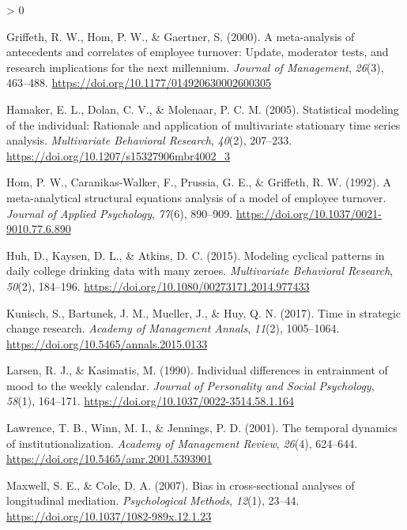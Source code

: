 \documentclass[
12pt, %
twoside,
english]{guelphthesis}
\newlength{\cslhangindent}
\newenvironment{CSLReferences}[2] %
 {%
  \setlength{\parindent}{0pt}
  \ifodd #1 \everypar{\setlength{\hangindent}{\cslhangindent}}\ignorespaces\fi
  \ifnum #2 > 0
  \setlength{\parskip}{\linespacing{2}}
  \fi
 }%
 {}
\begin{document}
\begin{CSLReferences}{1}{0}
\leavevmode{}%
Griffeth, R. W., Hom, P. W., \& Gaertner, S. (2000). A meta-analysis of antecedents and correlates of employee turnover: Update, moderator tests, and research implications for the next millennium. \emph{Journal of Management}, \emph{26}(3), 463--488. \url{https://doi.org/10.1177/014920630002600305}

\leavevmode{}%
Hamaker, E. L., Dolan, C. V., \& Molenaar, P. C. M. (2005). Statistical modeling of the individual: Rationale and application of multivariate stationary time series analysis. \emph{Multivariate Behavioral Research}, \emph{40}(2), 207--233. \url{https://doi.org/10.1207/s15327906mbr4002_3}

\leavevmode{}%
Hom, P. W., Caranikas-Walker, F., Prussia, G. E., \& Griffeth, R. W. (1992). A meta-analytical structural equations analysis of a model of employee turnover. \emph{Journal of Applied Psychology}, \emph{77}(6), 890--909. \url{https://doi.org/10.1037/0021-9010.77.6.890}

\leavevmode{}%
Huh, D., Kaysen, D. L., \& Atkins, D. C. (2015). Modeling cyclical patterns in daily college drinking data with many zeroes. \emph{Multivariate Behavioral Research}, \emph{50}(2), 184--196. \url{https://doi.org/10.1080/00273171.2014.977433}

\leavevmode{}%
Kunisch, S., Bartunek, J. M., Mueller, J., \& Huy, Q. N. (2017). Time in strategic change research. \emph{Academy of Management Annals}, \emph{11}(2), 1005--1064. \url{https://doi.org/10.5465/annals.2015.0133}

\leavevmode{}%
Larsen, R. J., \& Kasimatis, M. (1990). Individual differences in entrainment of mood to the weekly calendar. \emph{Journal of Personality and Social Psychology}, \emph{58}(1), 164--171. \url{https://doi.org/10.1037/0022-3514.58.1.164}

\leavevmode{}%
Lawrence, T. B., Winn, M. I., \& Jennings, P. D. (2001). The temporal dynamics of institutionalization. \emph{Academy of Management Review}, \emph{26}(4), 624--644. \url{https://doi.org/10.5465/amr.2001.5393901}

\leavevmode{}%
Maxwell, S. E., \& Cole, D. A. (2007). Bias in cross-sectional analyses of longitudinal mediation. \emph{Psychological Methods}, \emph{12}(1), 23--44. \url{https://doi.org/10.1037/1082-989x.12.1.23}


\end{CSLReferences}
\end{document}
